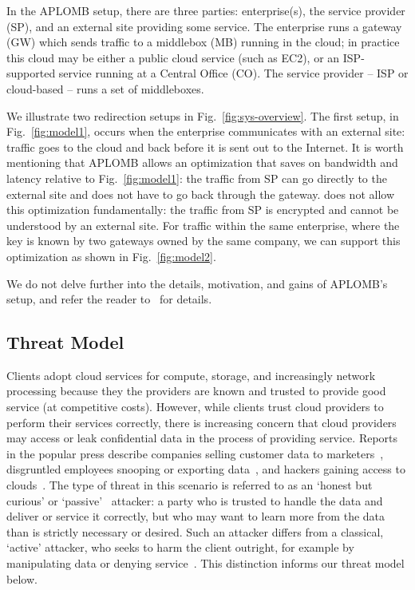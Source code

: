 In the APLOMB setup, there are three parties: enterprise(s), the service provider (SP), and an external site providing
some service. The enterprise runs a gateway (GW) which sends traffic to a middlebox (MB) running in the cloud; in practice this cloud may be either a public cloud service (such as EC2), or an ISP-supported service running at a Central Office (CO).
The service provider -- ISP or cloud-based -- runs a set of middleboxes. 

We illustrate two redirection setups in Fig.~\ref{fig:sys-overview}.  The first setup, in Fig.~\ref{fig:model1},  occurs when the enterprise communicates with an external site: traffic goes to the cloud and back before it is sent out to the Internet. 
It is worth mentioning that APLOMB allows an optimization that saves on bandwidth and latency relative to Fig.~\ref{fig:model1}: the traffic from SP can go directly to the external site and does not have to go back through the gateway. \sys does not allow this optimization fundamentally: the traffic from SP is encrypted and cannot be understood by an external site. 
For traffic within the same enterprise, where the key is known by two gateways owned by the same company, we can support this optimization as shown in Fig.~\ref{fig:model2}.


We do not delve further into the details, motivation, and gains of APLOMB's setup, and refer the reader to~\cite{aplomb} for details. 

\subsection{Threat Model}
  Clients adopt cloud services for compute, storage, and increasingly network processing because they the providers are known and trusted to provide good service (at competitive costs). 
  However, while clients trust cloud providers to perform their services correctly, there is increasing concern that cloud providers may access or leak confidential data in the process of providing service.
  Reports in the popular press describe companies selling customer data to marketers~\cite{radioshack}, disgruntled employees snooping or exporting data~\cite{att}, and hackers gaining access to clouds~\cite{databreach,PrivacyRecords}.
  The type of threat in this scenario is referred to as an `honest but curious' or `passive'~\cite{goodrich} attacker: a party who is trusted to handle the data and deliver or service it correctly, but who may want to learn more from the data than is strictly necessary or desired.
  Such an attacker differs from a classical, `active' attacker, who seeks to harm the client outright, for example by manipulating data or denying service~\cite{goodrich}.
  This distinction informs our threat model below. 

